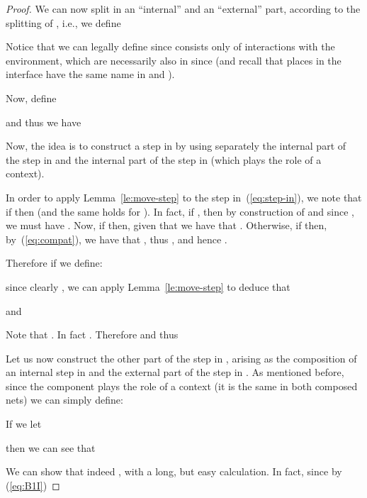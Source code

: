 \documentclass{LMCS}
\begin{document}
\begin{proof}
  \bigskip

  We can now split  in an ``internal'' and an ``external'' part,
  according to the splitting of , i.e., we define
  
  Notice that we can legally define  since 
  consists only of interactions with the environment, which are
  necessarily also in  since  (and recall that places in the interface have
  the same name in  and ).

  Now, define
  
  and thus we have
  
  
  

  Now, the idea is to construct a step in  by using
  separately the internal part of the step in  and the internal
  part of the step in  (which plays the role of a context).


  \medskip

  In order to apply Lemma~\ref{le:move-step} to the step
  in~(\ref{eq:step-in}), we note that if  then  (and the same holds for ).
In fact, if , then by construction of  and
  since , we must have . Now, if  then, given that  we have that . Otherwise, if
   then, by~(\ref{eq:compat}), we have that
  ,  thus , and
  hence .

  Therefore if we define:
  
  since clearly ,
  we can apply Lemma~\ref{le:move-step} to deduce that
  \begin{center}
    
  \end{center}
  and
  
Note that . In fact . Therefore 
   and thus
  \begin{quote}
    
  \end{quote}
  
  \bigskip

  Let us now construct the other part of the step in ,
  arising as the composition of an internal step in  and the
  external part of the step in . As mentioned before, since the
  component  plays the role of a context (it is the same in both
  composed nets) we can simply define:
  
  If we let
  
  then we can see that
  
  We can show that indeed , with a long, but
  easy calculation.  In fact, since  by (\ref{eq:B1I})
  

\end{proof}
\end{document}
